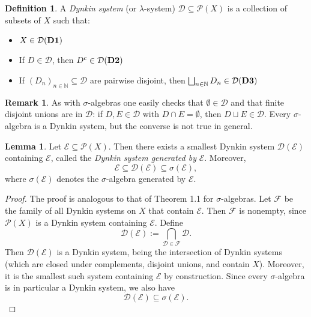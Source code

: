 \documentclass[12pt]{article}
\theoremstyle{definition}
\newtheorem{definition}{Definition}[section]
\newtheorem{lemma}[theorem]{Lemma}
\newtheorem{remark}{Remark}[section]
\begin{document}
\medskip
\begin{definition}
A \emph{Dynkin system} (or \(\lambda\)-system) \(\mathcal{D} \subseteq \mathcal{P}(X)\) is a collection of subsets of \(X\) such that:
\begin{itemize}
    \item \(X \in \mathcal{D} \hfill \text{(\textbf{D1})}\)
    \item If \(D \in \mathcal{D}\), then \(D^c \in \mathcal{D} \hfill \text{(\textbf{D2})}\)
    \item If \((D_n)_{n \in \mathbb{N}} \subseteq \mathcal{D}\) are pairwise disjoint, then \(\bigsqcup_{n \in \mathbb{N}} D_n \in \mathcal{D} \hfill \text{(\textbf{D3})}\)
\end{itemize}
\end{definition}

\medskip
\begin{remark}
As with \(\sigma\)-algebras one easily checks that \(\emptyset \in \mathcal{D}\) and that finite disjoint unions are in \(\mathcal{D}\): if \(D, E \in \mathcal{D}\) with \(D \cap E = \emptyset\), then \(D \sqcup E \in \mathcal{D}\). Every \(\sigma\)-algebra is a Dynkin system, but the converse is not true in general.
\end{remark}


\medskip
\begin{lemma}
Let \( \mathcal{E} \subseteq \mathcal{P}(X) \). Then there exists a smallest Dynkin system \( \mathcal{D}(\mathcal{E}) \) containing \( \mathcal{E} \), called the \emph{Dynkin system generated by} \( \mathcal{E} \). Moreover,
\[
\mathcal{E} \subseteq \mathcal{D}(\mathcal{E}) \subseteq \sigma(\mathcal{E}),
\]
where \( \sigma(\mathcal{E}) \) denotes the \(\sigma\)-algebra generated by \( \mathcal{E} \).
\end{lemma}

\begin{proof}
The proof is analogous to that of Theorem 1.1 for \(\sigma\)-algebras. Let \(\mathcal{F}\) be the family of all Dynkin systems on \(X\) that contain \(\mathcal{E}\). Then \(\mathcal{F}\) is nonempty, since \(\mathcal{P}(X)\) is a Dynkin system containing \(\mathcal{E}\). Define
\[
\mathcal{D}(\mathcal{E}) := \bigcap_{\mathcal{D} \in \mathcal{F}} \mathcal{D}.
\]
Then \(\mathcal{D}(\mathcal{E})\) is a Dynkin system, being the intersection of Dynkin systems (which are closed under complements, disjoint unions, and contain \(X\)). Moreover, it is the smallest such system containing \(\mathcal{E}\) by construction. Since every \(\sigma\)-algebra is in particular a Dynkin system, we also have
\[
\mathcal{D}(\mathcal{E}) \subseteq \sigma(\mathcal{E}).
\]
\end{proof}
\end{document}
